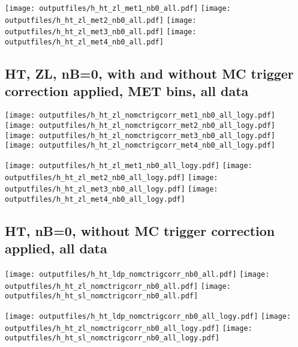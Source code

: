\documentclass[11pt]{article}
\begin{document}
    \noindent
     \texttt{[image: outputfiles/h\_ht\_zl\_met1\_nb0\_all.pdf]}
     \texttt{[image: outputfiles/h\_ht\_zl\_met2\_nb0\_all.pdf]}
     \texttt{[image: outputfiles/h\_ht\_zl\_met3\_nb0\_all.pdf]}
     \texttt{[image: outputfiles/h\_ht\_zl\_met4\_nb0\_all.pdf]}

   \clearpage
     \subsection{ HT, ZL, nB=0, with and without MC trigger correction applied, MET bins, all data}

    \noindent
     \texttt{[image: outputfiles/h\_ht\_zl\_nomctrigcorr\_met1\_nb0\_all\_logy.pdf]}
     \texttt{[image: outputfiles/h\_ht\_zl\_nomctrigcorr\_met2\_nb0\_all\_logy.pdf]}
     \texttt{[image: outputfiles/h\_ht\_zl\_nomctrigcorr\_met3\_nb0\_all\_logy.pdf]}
     \texttt{[image: outputfiles/h\_ht\_zl\_nomctrigcorr\_met4\_nb0\_all\_logy.pdf]}

    \noindent
     \texttt{[image: outputfiles/h\_ht\_zl\_met1\_nb0\_all\_logy.pdf]}
     \texttt{[image: outputfiles/h\_ht\_zl\_met2\_nb0\_all\_logy.pdf]}
     \texttt{[image: outputfiles/h\_ht\_zl\_met3\_nb0\_all\_logy.pdf]}
     \texttt{[image: outputfiles/h\_ht\_zl\_met4\_nb0\_all\_logy.pdf]}

   \clearpage
    \subsection{ HT, nB=0, without MC trigger correction applied, all data}

    \noindent
    \texttt{[image: outputfiles/h\_ht\_ldp\_nomctrigcorr\_nb0\_all.pdf]}
    \texttt{[image: outputfiles/h\_ht\_zl\_nomctrigcorr\_nb0\_all.pdf]}
    \texttt{[image: outputfiles/h\_ht\_sl\_nomctrigcorr\_nb0\_all.pdf]}

    \noindent
    \texttt{[image: outputfiles/h\_ht\_ldp\_nomctrigcorr\_nb0\_all\_logy.pdf]}
    \texttt{[image: outputfiles/h\_ht\_zl\_nomctrigcorr\_nb0\_all\_logy.pdf]}
    \texttt{[image: outputfiles/h\_ht\_sl\_nomctrigcorr\_nb0\_all\_logy.pdf]}
\end{document}
